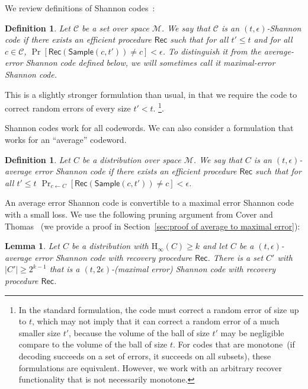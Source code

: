 \documentclass[11pt]{article}
\newcommand{\secref}[1]{\mbox{Section~\ref{#1}}}
\newcommand{\class}[1]{{\ensuremath{\mathsf{#1}}}}
\newcommand{\rec}{\ensuremath{\class{Rec}}\xspace}
\newcommand{\sample}{\ensuremath{\class{Sample}}\xspace}
\newcommand{\Hoo}{\mathrm{H}_\infty}
\newtheorem{lemma}[theorem]{Lemma}
\newtheorem{definition}[theorem]{Definition}
\begin{document}
We review definitions of Shannon codes~\cite{shannon1949mathematical}:
\begin{definition}
Let $\mathcal{C}$ be a set over space $\mathcal{M}$.  We say that $\mathcal{C}$ is an $(t,\epsilon)$-\emph{Shannon code} if there exists an efficient procedure $\rec$ such that for all $t'\le t$ and for all $c\in \mathcal{C}$, $\Pr[\rec(\sample(c, t')) \neq c]<\epsilon$. To distinguish it from the average-error Shannon code defined below, we will sometimes call it \emph{maximal-error} Shannon code.
\end{definition}
This is a slightly stronger formulation than usual, in that we require the code to correct random errors of every size $t'<t$. \footnote{In the standard formulation, the code must correct a random error of size up to $t$, which may not imply that it can correct a random error of a much smaller size $t'$, because the volume of the ball of size $t'$ may be negligible compare to the volume of the ball of size $t$.  For codes that are monotone~(if decoding succeeds on a set of errors, it succeeds on all subsets), these formulations are equivalent.  However, we work with an arbitrary recover functionality that is not necessarily monotone.}.  

Shannon codes work for all codewords. We can also consider a formulation that works for an ``average'' codeword. \begin{definition}
Let $C$ be a distribution over space $\mathcal{M}$.  We say that $C$ is an $(t,\epsilon)$-\emph{average error Shannon code} if there exists an efficient procedure $\rec$ such that for all $t'\le t$
$\Pr_{c\leftarrow C}[\rec(\sample(c, t')) \neq c]<\epsilon$.
\end{definition}
An average error Shannon code is convertible to a maximal error Shannon code with a small loss.  We use the following pruning argument from Cover and Thomas~\cite[Pages 202-204]{cover2006elements} (we provide a proof in \secref{sec:proof of average to maximal error}):
\begin{lemma}
\label{lem:averageToMaximalError}
Let $C$ be a distribution with $\Hoo(C)\geq k$ and let $C$ be a $(t, \epsilon)$-average error Shannon code with recovery procedure $\rec$.  There is a set $C'$ with $|C'|\ge2^{k-1}$ that  is a $(t, 2\epsilon)$-(maximal error) Shannon code with recovery procedure $\rec$.
\end{lemma}
\end{document}
